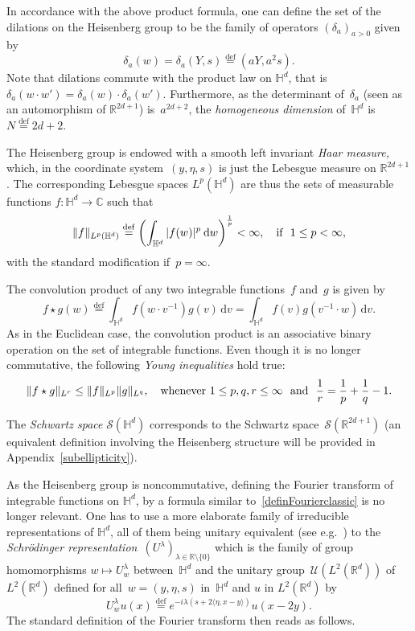 \documentclass[10pt]{amsart}
\theoremstyle{definition}\newtheorem{defi}[theo]{Definition}\newtheorem{rema}[theo]{Remark}\newtheorem{exam}[theo]{Example}\newtheorem{exem}[theo]{Example}\newtheorem{nota}[theo]{Notation}
\newcommand{\lam}{\lambda}
\newcommand*\cS{\mathcal{S}}
\newcommand*\cU{\mathcal{U}}
\newcommand*\bbC{\mathbb{C}}
\newcommand*\R{\mathbb{R}}
\newcommand*\bbH{\mathbb{H}}
\newcommand\norm[2]{\|#1\|_{#2}}
\newcommand*\eqdefa{\overset{\mathrm{def}}{=}}
\newcommand*{\dd}{\mathrm{d}}
\newcommand{\dv}{\dd v}
\newcommand{\dw}{\dd w}
\begin{document}
In accordance with the above product formula, one can define the set of the dilations on the Heisenberg group to be the family of operators $(\delta_a)_{a>0}$ given by
\begin{equation}\label{defdilations}
\delta_a(w) = \delta_a (Y,s) \eqdefa (aY,a^2s).
\end{equation}
Note that dilations commute with the product law on $\bbH^d$, that is $\delta_a(w\cdot w') = \delta_a(w) \cdot \delta_a (w')$. Furthermore, as the determinant of~$\delta_a$ (seen as an automorphism of $\R^{2d+1}$) is~$a^{2d+2}$, the \emph{homogeneous dimension} of~$\bbH^d$ is~$N\eqdefa2d+2$.

The Heisenberg group is endowed with a smooth left invariant \emph{Haar measure,} which, in the coordinate system~$(y, \eta, s)$ is just the Lebesgue measure on $\R^{2d+1}$. The corresponding Lebesgue spaces $L^p (\bbH^d)$ are thus the sets of measurable functions $f:\bbH^d\to\bbC$ such that
\[
\|f\|_{L^p (\bbH^d)} \eqdefa \left(\int_{\bbH^d} |f(w)|^p \: \dw \right)^\frac1p<\infty, \quad\hbox{if }\ 1\leq p<\infty,
\]
with the standard modification if~$p=\infty$.

The convolution product of any two integrable functions~$f$ and~$g$ is given by
\[
f \star g (w) \eqdefa \int_{\bbH^d} f (w \cdot v^{-1}) g(v)\, \dv = \int_{\bbH^d} f (v) g(v^{-1} \cdot w)\, \dv.
\]
As in the Euclidean case, the convolution product is an associative binary operation on the set of integrable functions. Even though it is no longer commutative, the following \emph{Young inequalities} hold true:
\[
\norm{ f \star g }{L^r} \leq \norm f {L^p} \norm g {L^q},
\quad \hbox{whenever}\ 1\leq p,q,r\leq\infty\ \hbox{ and }\
\frac{1}{r} = \frac{1}{p} + \frac{1}{q} - 1.
\]

The \emph{Schwartz space} $\cS(\bbH^d)$ corresponds to the Schwartz space~$\cS(\R^{2d+1})$ (an equivalent definition involving the Heisenberg structure will be provided in Appendix~\ref{subellipticity}).

As the Heisenberg group is noncommutative, defining the Fourier transform of integrable functions on $\bbH^d$, by a formula similar to~\eqref{definFourierclassic} is no longer relevant. One has to use a more elaborate family of irreducible representations of $\bbH^d$, all of them being unitary equivalent (see e.g.~\cite[Chapter~2]{taylor1}) to the \emph{Schr\"odinger representation}~$(U^\lam)_{\lambda\in\R\setminus\{0\}}$ which is the family of group homomorphisms $w\mapsto U^\lam_w$ between~$\bbH^d$ and the unitary group~$\cU(L^2(\R^d))$ of~$L^2(\R^d)$ defined for all~$w=(y,\eta, s)$ in~$\bbH^d$ and $u$ in $L^2(\R^d)$ by
\[
U^\lam _w u(x)\eqdefa e^{-i\lam (s+2\langle \eta, x-y\rangle)} u(x-2y).
\]
The standard definition of the Fourier transform then reads as follows.
\end{document}
